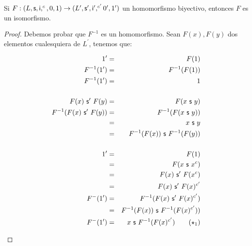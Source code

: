   \begin{lemma} \label{lemma_16}
    \PN Si $F:(L, \mathsf{s}, \mathsf{i}, ^{c}, 0, 1) \rightarrow (L^{\prime}, \mathsf{s}^{\prime}, \mathsf{i}^{\prime}, ^{c^{\prime}} 0^{\prime}, 1^{\prime})$ un homomorfismo biyectivo, entonces $F$ es un isomorfismo.
  \end{lemma}
  \begin{proof}
      \PN Debemos probar que $F^{-1}$ es un homomorfismo. Sean $F(x), F(y)$ dos elementos cualesquiera de $L^{\prime}$,
      tenemos que:
      \begin{multicols}{2}
        \begin{eqnarray*}
          1^{\prime} &=& F(1) \\
          F^{-1}(1^{\prime}) &=& F^{-1}(F(1)) \\
          F^{-1}(1^{\prime}) &=& 1 \\
          \\
          F(x) \ \SU^{\prime} \ F(y) &=& F(x \ \SU \ y) \\
          F^{-1}(F(x) \ \SU^{\prime} \ F(y)) &=& F^{-1}(F(x \ \SU \ y)) \\
          &=& x \ \SU \ y \\
          &=& F^{-1}(F(x)) \ \SU \ F^{-1}(F(y)) \\
          \\
          1^{\prime} &=& F(1) \\
          &=& F(x \ \SU \ x^{c}) \\
          &=& F(x) \ \SU^{\prime} \ F(x^{c}) \\
          &=& F(x) \ \SU^{\prime} \ F(x)^{c^{\prime}} \\
          F^{-}(1^{\prime}) &=& F^{-1}(F(x) \ \SU^{\prime} \ F(x)^{c^{\prime}}) \\
          &=& F^{-1}(F(x)) \ \SU \ F^{-1}(F(x)^{c^{\prime}})) \\
          F^{-}(1^{\prime}) &=& x \ \SU \ F^{-1}(F(x)^{c^{\prime}}) \qquad (\star_{1})
        \end{eqnarray*}


\end{multicols}
\end{proof}
